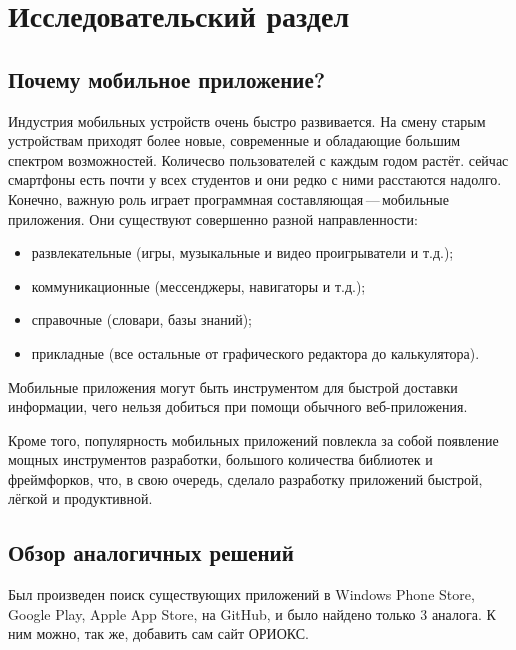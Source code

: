 \chapter{Исследовательский раздел}
\label{cha:analysis}
%
%

\section{Почему мобильное приложение?}

Индустрия мобильных устройств очень быстро развивается. На смену старым устройствам приходят более новые, современные и обладающие большим спектром возможностей. Количесво пользователей с каждым годом растёт. сейчас смартфоны есть почти у всех студентов и они редко с ними расстаются надолго. Конечно, важную роль играет программная составляющая\,---\,мобильные приложения. Они существуют совершенно разной направленности:
\begin{itemize}
    \item развлекательные (игры, музыкальные и видео проигрыватели и т.д.);
    \item коммуникационные (мессенджеры, навигаторы и т.д.);
    \item справочные (словари, базы знаний);
    \item прикладные (все остальные от графического редактора до калькулятора).
\end{itemize}

Мобильные приложения могут быть инструментом для быстрой доставки информации, чего нельзя добиться при помощи обычного веб-приложения.

Кроме того, популярность мобильных приложений повлекла за собой появление мощных инструментов разработки, большого количества библиотек и фреймфорков, что, в свою очередь, сделало разработку приложений быстрой, лёгкой и продуктивной.


\section{Обзор аналогичных решений}

Был произведен поиск существующих приложений в Windows Phone Store, Google Play, Apple App Store, на GitHub, и было найдено только 3 аналога. К ним можно, так же, добавить сам сайт ОРИОКС.

